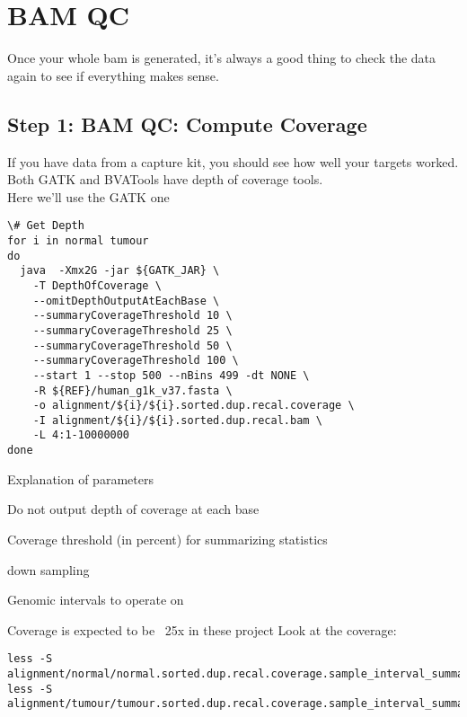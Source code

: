 \section{BAM QC}

Once your whole bam is generated, it's always a good thing to check the data again to see if everything makes sense.

\subsection{Step 1: BAM QC: Compute Coverage}
If you have data from a capture kit, you should see how well your targets worked. Both GATK and BVATools have depth of coverage tools. \\
Here we'll use the GATK one
\begin{lstlisting}
\# Get Depth
for i in normal tumour
do
  java  -Xmx2G -jar ${GATK_JAR} \
    -T DepthOfCoverage \
    --omitDepthOutputAtEachBase \
    --summaryCoverageThreshold 10 \
    --summaryCoverageThreshold 25 \
    --summaryCoverageThreshold 50 \
    --summaryCoverageThreshold 100 \
    --start 1 --stop 500 --nBins 499 -dt NONE \
    -R ${REF}/human_g1k_v37.fasta \
    -o alignment/${i}/${i}.sorted.dup.recal.coverage \
    -I alignment/${i}/${i}.sorted.dup.recal.bam \
    -L 4:1-10000000
done
\end{lstlisting}

\begin{note}
Explanation of parameters
\begin{description}[style=multiline,labelindent=0cm,align=right,leftmargin=\descriptionlabelspace,rightmargin=1.5cm,font=\ttfamily]
 \item[omitBaseOutput] Do not output depth of coverage at each base
 \item[summaryCoverageThreshol] Coverage threshold (in percent) for summarizing statistics
 \item[dt] down sampling
 \item[L] Genomic intervals to operate on
\end{description}
\end{note}

Coverage is expected to be ~25x in these project
Look at the coverage:

\begin{lstlisting}
less -S alignment/normal/normal.sorted.dup.recal.coverage.sample_interval_summary
less -S alignment/tumour/tumour.sorted.dup.recal.coverage.sample_interval_summary
\end{lstlisting}

